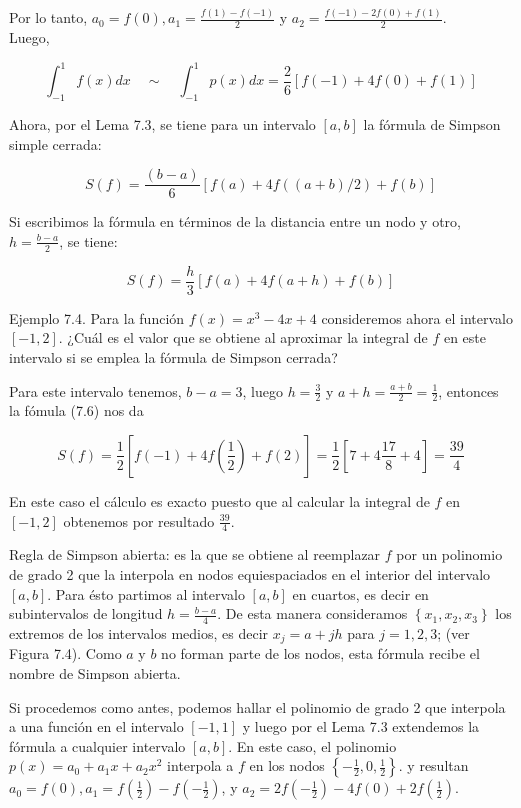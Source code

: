 \documentclass[10pt]{article}
\begin{document}
Por lo tanto, $a_{0}=f(0), a_{1}=\frac{f(1)-f(-1)}{2}$ y $a_{2}=\frac{f(-1)-2 f(0)+f(1)}{2}$.\\
Luego,

$$
\int_{-1}^{1} f(x) d x \quad \sim \quad \int_{-1}^{1} p(x) d x=\frac{2}{6}[f(-1)+4 f(0)+f(1)]
$$

Ahora, por el Lema 7.3, se tiene para un intervalo $[a, b]$ la fórmula de Simpson simple cerrada:

$$
S(f)=\frac{(b-a)}{6}[f(a)+4 f((a+b) / 2)+f(b)]
$$

Si escribimos la fórmula en términos de la distancia entre un nodo y otro, $h=\frac{b-a}{2}$, se tiene:


\begin{equation*}
S(f)=\frac{h}{3}[f(a)+4 f(a+h)+f(b)] \tag{7.6}
\end{equation*}


Ejemplo 7.4. Para la función $f(x)=x^{3}-4 x+4$ consideremos ahora el intervalo $[-1,2]$. ¿Cuál es el valor que se obtiene al aproximar la integral de $f$ en este intervalo si se emplea la fórmula de Simpson cerrada?

Para este intervalo tenemos, $b-a=3$, luego $h=\frac{3}{2}$ y $a+h=\frac{a+b}{2}=\frac{1}{2}$, entonces la fómula (7.6) nos da

$$
S(f)=\frac{1}{2}\left[f(-1)+4 f\left(\frac{1}{2}\right)+f(2)\right]=\frac{1}{2}\left[7+4 \frac{17}{8}+4\right]=\frac{39}{4}
$$

En este caso el cálculo es exacto puesto que al calcular la integral de $f$ en $[-1,2]$ obtenemos por resultado $\frac{39}{4}$.

Regla de Simpson abierta: es la que se obtiene al reemplazar $f$ por un polinomio de grado 2 que la interpola en nodos equiespaciados en el interior del intervalo $[a, b]$. Para ésto partimos al intervalo $[a, b]$ en cuartos, es decir en subintervalos de longitud $h=\frac{b-a}{4}$. De esta manera consideramos $\left\{x_{1}, x_{2}, x_{3}\right\}$ los extremos de los intervalos medios, es decir $x_{j}=a+j h$ para $j=1,2,3$; (ver Figura 7.4). Como $a$ y $b$ no forman parte de los nodos, esta fórmula recibe el nombre de Simpson abierta.

Si procedemos como antes, podemos hallar el polinomio de grado 2 que interpola a una función en el intervalo $[-1,1]$ y luego por el Lema 7.3 extendemos la fórmula a cualquier intervalo $[a, b]$. En este caso, el polinomio $p(x)=a_{0}+a_{1} x+a_{2} x^{2}$ interpola a $f$ en los nodos $\left\{-\frac{1}{2}, 0, \frac{1}{2}\right\}$. y resultan $a_{0}=f(0), a_{1}=f\left(\frac{1}{2}\right)-f\left(-\frac{1}{2}\right)$, y $a_{2}=2 f\left(-\frac{1}{2}\right)-4 f(0)+2 f\left(\frac{1}{2}\right)$.
\end{document}
